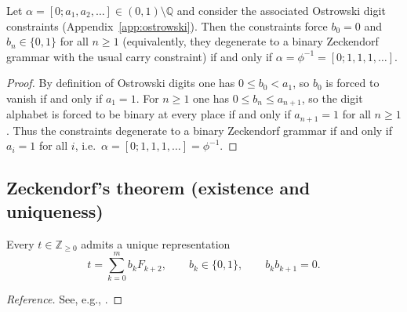 \begin{proposition}
\label{prop:golden_zeckendorf_equivalence}
Let $\alpha=[0;a_1,a_2,\dots]\in(0,1)\setminus\mathbb{Q}$ and consider the associated Ostrowski digit constraints (Appendix~\ref{app:ostrowski}). Then the constraints force $b_0=0$ and $b_n\in\{0,1\}$ for all $n\ge 1$ (equivalently, they degenerate to a binary Zeckendorf grammar with the usual carry constraint) if and only if $\alpha=\phi^{-1}=[0;1,1,1,\dots]$.
\end{proposition}
\begin{proof}
By definition of Ostrowski digits one has $0\le b_0<a_1$, so $b_0$ is forced to vanish if and only if $a_1=1$.
For $n\ge 1$ one has $0\le b_n\le a_{n+1}$, so the digit alphabet is forced to be binary at every place if and only if $a_{n+1}=1$ for all $n\ge 1$.
Thus the constraints degenerate to a binary Zeckendorf grammar if and only if $a_i=1$ for all $i$, i.e.\ $\alpha=[0;1,1,1,\dots]=\phi^{-1}$.
\end{proof}

\subsection{Zeckendorf's theorem (existence and uniqueness)}
\label{app:zeckendorf_proof}
\begin{theorem}[Zeckendorf]
Every $t\in\mathbb{Z}_{\ge 0}$ admits a unique representation
\begin{equation}
    t=\sum_{k=0}^{m} b_k F_{k+2},\qquad b_k\in\{0,1\},\qquad b_k b_{k+1}=0.
\end{equation}
\end{theorem}
\begin{proof}[Reference]
See, e.g., \cite{Zeckendorf1972,AlloucheShallit2003}.
\end{proof}

